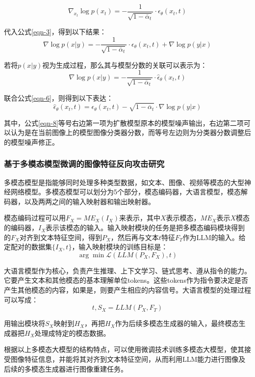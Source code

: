 \begin{equation}\label{eqn-5}
      \nabla_{x_t} \log p(x_t) = - \frac{1}{\sqrt{1-\overline{\alpha}_t}} \cdot\epsilon_\theta(x_t,t)
\end{equation}
\par
代入公式\eqref{eqn-3}，得到以下结果：
\begin{equation}\label{eqn-6}
      \nabla \log p(x|y) = - \frac{1}{\sqrt{1-\overline{\alpha}_t}} \cdot\epsilon_\theta(x_t,t)
      + \nabla \log p(y|x)
\end{equation}
\par
若将$p(x|y)$视为生成过程，那么其与模型分数的关联可以表示为：
\begin{equation}\label{eqn-7}
      \nabla \log p(x|y) = - \frac{1}{\sqrt{1-\overline{\alpha}_t}} \cdot\hat{\epsilon}_\theta(x_t,t)
\end{equation}
\par
联合公式\eqref{eqn-6}，则得到以下表达：
\begin{equation}\label{eqn-8}
      \hat{\epsilon}_\theta(x_t,t) = \epsilon_\theta(x_t,t) -\sqrt{1-\overline{\alpha}_t} \cdot \nabla \log p(y|x)
\end{equation}
\par
其中，公式\eqref{eqn-8}等号右边第一项为扩散模型原本的模型噪声输出，右边第二项可以认为是在当前图像上的模型图像分类器分数，而等号左边则为分类器分数调整后的模型噪声修正。
\subsubsection{基于多模态模型微调的图像特征反向攻击研究}
多模态模型是指能够同时处理多种类型数据，如文本、图像、视频等模态的大型神经网络模型。多模态模型可以划分为5个部分，模态编码器，大语言模型，模态解码器，以及两两之间的输入映射器和输出映射器。
\par
模态编码过程可以用$F_X = ME_X(I_X)$来表示，其中$X$表示模态，$ME_X$表示$X$模态的编码器，$I_X$表示该模态的输入。输入映射模块的任务是把多模态编码模块得到的$F_X$对齐到文本特征空间，得到$P_X$，然后再与文本$t$特征$F_T$作为LLM的输入。给定配对的数据集$\{I_X,t\}$，输入映射模块的训练目标是：
\begin{equation}\label{eqn-9}
      \arg \min \mathcal{L}(LLM(P_X,F_X),t)
\end{equation}
\par
大语言模型作为核心，负责产生推理、上下文学习、链式思考、遵从指令的能力。它要产生文本和其他模态的基本理解单位tokens。这些tokens作为指令要决定是否产生其他模态的内容，如果是，则要产生相应的内容信号。大语言模型的处理过程可以写成：
\begin{equation}\label{eqn-10}
      t,S_X = LLM(P_X,F_T)
\end{equation}
\par
用输出模块将$S_X$映射到$H_X$，再把$H_X$作为后续多模态生成器的输入，最终模态生成器把$H_X$处理成特定的模态数据。
\par
根据以上多模态大模型的结构特点，可以使用微调技术训练多模态大模型，使其接受图像特征信息，并能将其对齐到文本特征空间，从而利用LLM能力进行图像及后续的多模态生成器进行图像重建任务。
